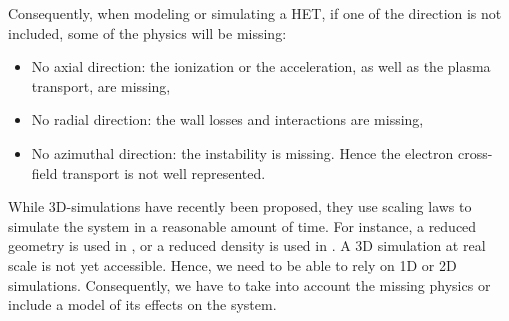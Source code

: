 Consequently, when modeling or simulating a \ac{HET}, if one of the direction is not included, some of the physics will be missing\string:
\begin{itemize}
  \item No axial direction\string: the ionization or the acceleration, as well as the plasma transport, are missing,
  \item No radial direction\string: the wall losses and interactions are missing,
  \item No azimuthal direction\string: the instability is missing. Hence the electron cross-field transport is not well represented.
\end{itemize}

While \ac{3D}-simulations have recently been proposed, they use scaling laws to simulate the system in a reasonable amount of time\citep{taccogna2019a}.
For instance, a reduced geometry is used in \citet{taccogna2018}, or a reduced density is used in \citet{fubiani2018a}.
A \ac{3D} simulation at real scale is not yet accessible.
Hence, we need to be able to rely on \ac{1D} or \ac{2D} simulations.
Consequently, we have to take into account the missing physics or include a model of its effects on the system.
